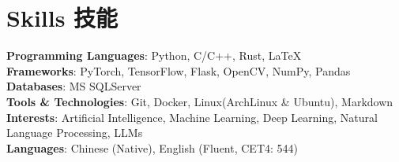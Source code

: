 \section*{ Skills 技能}

\textbf{Programming Languages}: Python, C/C++, Rust, LaTeX \\
\textbf{Frameworks}: PyTorch, TensorFlow, Flask, OpenCV, NumPy, Pandas \\
\textbf{Databases}: MS SQLServer \\
\textbf{Tools \& Technologies}: Git, Docker, Linux(ArchLinux \& Ubuntu), Markdown \\
\textbf{Interests}: Artificial Intelligence, Machine Learning, Deep Learning, Natural Language Processing, LLMs \\
\textbf{Languages}: Chinese (Native), English (Fluent, CET4: 544) \\